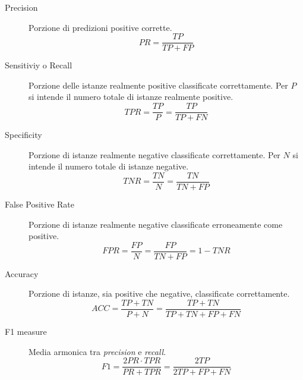             \begin{description}
                \item [Precision] Porzione di predizioni positive corrette.
                \begin{equation}
                    \label{eq:precision}
                    PR = \frac{TP}{TP + FP}
                \end{equation}

                \item [Sensitiviy o Recall] Porzione delle istanze realmente positive classificate correttamente. Per $P$ si intende il numero totale di istanze realmente positive.
                \begin{equation}
                    \label{eq:tpr}
                    TPR = \frac{TP}{P} = \frac{TP}{TP + FN}
                \end{equation}

                \item [Specificity] Porzione di istanze realmente negative classificate correttamente. Per $N$ si intende il numero totale di istanze negative.
                \begin{equation}
                    \label{eq:tnr} 
                    TNR = \frac{TN}{N} = \frac{TN}{TN + FP}
                \end{equation}

                \item [False Positive Rate] Porzione di istanze realmente negative classificate erroneamente come positive.
                \begin{equation}
                    \label{eq:fpr}
                    FPR = \frac{FP}{N} = \frac{FP}{TN + FP} = 1 - TNR
                \end{equation}

                \item [Accuracy] Porzione di istanze, sia positive che negative, classificate correttamente.
                \begin{equation}
                    \label{eq:accuracy}
                    ACC = \frac{TP+TN}{P + N} = \frac{TP + TN}{TP + TN + FP + FN}
                \end{equation}

                \item [F1 measure] Media armonica tra \emph{precision} e \emph{recall}.
                \begin{equation}
                    \label{eq:f1_measure}
                    F1 = \frac{2PR\cdot TPR}{PR + TPR} = \frac{2TP}{2TP + FP + FN}
                \end{equation}
            \end{description}

